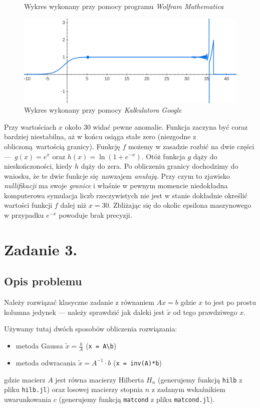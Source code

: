 \documentclass[10pt]{article}
\begin{document}
\begin{figure}[H]
    \centering
    \def\svgwidth{0.8\columnwidth}
    
    \caption{Wykres wykonany przy pomocy programu \textit{Wolfram Mathematica}}
\end{figure}

\begin{figure}[H]
    \centering
    \includegraphics{ex-2-2.png}
    \caption{Wykres wykonany przy pomocy \textit{Kalkulatora Google}}
\end{figure}

Przy wartościach $x$ około $30$ widać pewne anomalie. Funkcja zaczyna być coraz bardziej niestabilna, aż w końcu osiąga stałe zero (niezgodne z obliczoną wartością granicy). Funkcję $f$ możemy w zasadzie rozbić na dwie części — $g(x) = e^x$ oraz $h(x) = \ln(1 + e^{-x})$. Otóż funkcja $g$ dąży do nieskończoności, kiedy $h$ dąży do zera. Po obliczeniu granicy dochodzimy do wniosku, że te dwie funkcje się nawzajem \textit{anulują}. Przy czym to zjawisko \textit{nullifikacji} ma swoje \textit{granice} i właśnie w pewnym momencie niedokładna komputerowa symulacja liczb rzeczywistych nie jest w stanie dokładnie określić wartości funkcji $f$ dalej niż $x = 30$. Zbliżając się do okolic epsilona maszynowego w przypadku $e^{-x}$ powoduje brak precyzji.

\section{Zadanie 3.}

\subsection{Opis problemu}

Należy rozwiązać klasyczne zadanie z równaniem $Ax = b$ gdzie $x$ to jest po prostu kolumna jedynek — należy sprawdzić jak daleki jest $\tilde{x}$ od tego prawdziwego $x$.

Używamy tutaj dwóch sposobów obliczenia rozwiązania:
\begin{itemize}
    \item metoda Gaussa $\tilde{x} = \frac{b}{A}$ (\texttt{x = A\textbackslash b})
    \item metoda odwracania $\tilde{x} = A^{-1} \cdot b$ (\texttt{x = inv(A)*b})
\end{itemize}
gdzie macierz $A$ jest równa macierzy Hilberta $H_n$ (generujemy funkcją \texttt{hilb} z pliku \texttt{hilb.jl})
oraz losowej macierzy stopnia $n$ z zadanym wskaźnikiem uwarunkowania $c$ (generujemy funkcją \texttt{matcond} z pliku \texttt{matcond.jl}).
\end{document}
